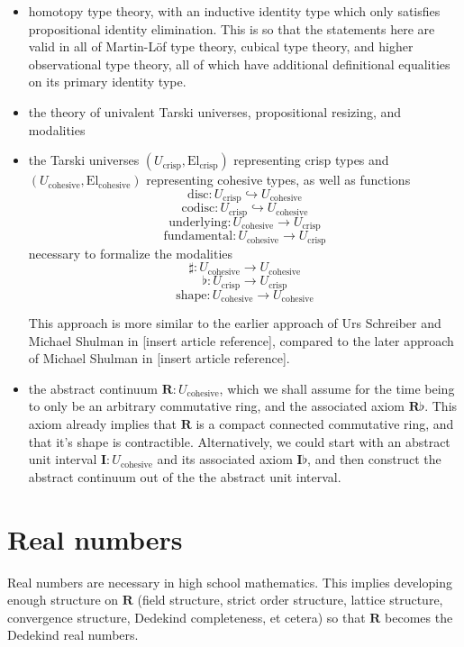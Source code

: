 \documentclass[one]{article}
\begin{document}
\begin{itemize}
\item homotopy type theory, with an inductive identity type which only satisfies propositional identity elimination. This is so that the statements here are valid in all of Martin-Löf type theory, cubical type theory, and higher observational type theory, all of which have additional definitional equalities on its primary identity type. 

\item the theory of univalent Tarski universes, propositional resizing, and modalities

\item the Tarski universes $(U_\mathrm{crisp}, \mathrm{El}_\mathrm{crisp})$ representing crisp types and $(U_\mathrm{cohesive}, \mathrm{El}_\mathrm{cohesive})$ representing cohesive types, as well as functions 
$$\mathrm{disc}:U_\mathrm{crisp} \hookrightarrow U_\mathrm{cohesive}$$ 
$$\mathrm{codisc}:U_\mathrm{crisp} \hookrightarrow U_\mathrm{cohesive}$$
$$\mathrm{underlying}:U_\mathrm{cohesive} \to U_\mathrm{crisp}$$ 
$$\mathrm{fundamental}:U_\mathrm{cohesive} \to U_\mathrm{crisp}$$ 
necessary to formalize the modalities 
$$\sharp:U_\mathrm{cohesive} \to U_\mathrm{cohesive}$$
$$\flat:U_\mathrm{crisp} \to U_\mathrm{crisp}$$
$$\mathrm{shape}:U_\mathrm{cohesive} \to U_\mathrm{cohesive}$$

This approach is more similar to the earlier approach of Urs Schreiber and Michael Shulman in [insert article reference], compared to the later approach of Michael Shulman in [insert article reference]. 

\item the abstract continuum $\mathbf{R}:U_\mathrm{cohesive}$, which we shall assume for the time being to only be an arbitrary commutative ring, and the associated axiom $\mathbf{R} \flat$. This axiom already implies that $\mathbf{R}$ is a compact connected commutative ring, and that it's shape is contractible. Alternatively, we could start with an abstract unit interval $\mathbf{I}:U_\mathrm{cohesive}$ and its associated axiom $\mathbf{I} \flat$, and then construct the abstract continuum out of the the abstract unit interval. 
\end{itemize}

\section{Real numbers}

Real numbers are necessary in high school mathematics. This implies developing enough structure on $\mathbf{R}$ (field structure, strict order structure, lattice structure, convergence structure, Dedekind completeness, et cetera) so that $\mathbf{R}$ becomes the Dedekind real numbers. 
\end{document}
